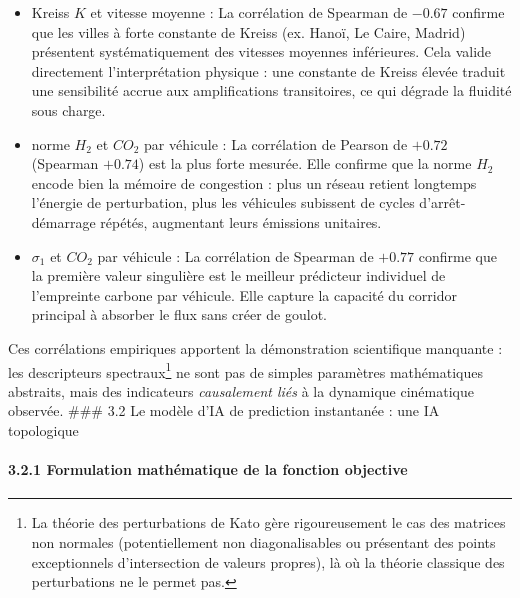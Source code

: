 \documentclass[10pt, a4paper]{article}
\providecommand{\tightlist}{}
\begin{document}
\begin{itemize}
\tightlist
\item
  Kreiss \(K\) et vitesse moyenne : La corrélation de Spearman de
  \(-0.67\) confirme que les villes à forte constante de Kreiss (ex.
  Hanoï, Le Caire, Madrid) présentent systématiquement des vitesses
  moyennes inférieures. Cela valide directement l'interprétation
  physique : une constante de Kreiss élevée traduit une sensibilité
  accrue aux amplifications transitoires, ce qui dégrade la fluidité
  sous charge.
\item
  norme \(H_2\) et \(CO_2\) par véhicule : La corrélation de Pearson de
  \(+0.72\) (Spearman \(+0.74\)) est la plus forte mesurée. Elle
  confirme que la norme \(H_2\) encode bien la mémoire de congestion :
  plus un réseau retient longtemps l'énergie de perturbation, plus les
  véhicules subissent de cycles d'arrêt-démarrage répétés, augmentant
  leurs émissions unitaires.
\item
  \(\sigma_1\) et \(CO_2\) par véhicule : La corrélation de Spearman de
  \(+0.77\) confirme que la première valeur singulière est le meilleur
  prédicteur individuel de l'empreinte carbone par véhicule. Elle
  capture la capacité du corridor principal à absorber le flux sans
  créer de goulot.
\end{itemize}

Ces corrélations empiriques apportent la démonstration scientifique
manquante : les descripteurs
spectraux\footnote{La théorie des perturbations de Kato gère rigoureusement le cas des matrices non normales (potentiellement non diagonalisables ou présentant des points exceptionnels d'intersection de valeurs propres), là où la théorie classique des perturbations ne le permet pas.}
ne sont pas de simples paramètres mathématiques abstraits, mais des
indicateurs \emph{causalement liés} à la dynamique cinématique observée.
\#\#\# 3.2 Le modèle d'IA de prediction instantanée : une IA topologique

\paragraph{3.2.1 Formulation mathématique de la fonction
objective}\label{formulation-mathuxe9matique-de-la-fonction-objective}
\end{document}
